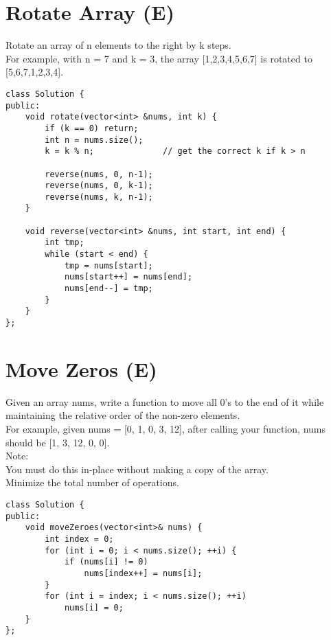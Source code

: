 \section{Rotate Array (E)}
Rotate an array of n elements to the right by k steps.\\

For example, with n = 7 and k = 3, the array [1,2,3,4,5,6,7] is rotated to [5,6,7,1,2,3,4]. \\

\begin{lstlisting}
class Solution {
public:
    void rotate(vector<int> &nums, int k) {
        if (k == 0) return;
        int n = nums.size();
        k = k % n;              // get the correct k if k > n
        
        reverse(nums, 0, n-1);
        reverse(nums, 0, k-1);
        reverse(nums, k, n-1);
    }
    
    void reverse(vector<int> &nums, int start, int end) {
        int tmp; 
        while (start < end) {
            tmp = nums[start];
            nums[start++] = nums[end];
            nums[end--] = tmp;
        }
    }
};
\end{lstlisting}


\section{Move Zeros (E)}
Given an array nums, write a function to move all 0's to the end of it while maintaining the relative order of the non-zero elements.\\

For example, given nums = [0, 1, 0, 3, 12], after calling your function, nums should be [1, 3, 12, 0, 0].\\

Note:\\
    You must do this in-place without making a copy of the array.\\
    Minimize the total number of operations.\\
    
\begin{lstlisting}
class Solution {
public:
    void moveZeroes(vector<int>& nums) {
        int index = 0;
        for (int i = 0; i < nums.size(); ++i) {
            if (nums[i] != 0)
                nums[index++] = nums[i];
        }
        for (int i = index; i < nums.size(); ++i)
            nums[i] = 0;
    }
};
\end{lstlisting}


